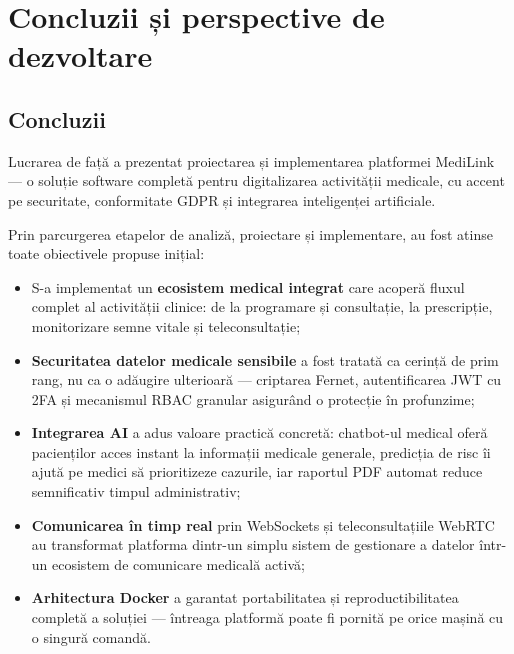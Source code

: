 \chapter{Concluzii și perspective de dezvoltare}

\section{Concluzii}

Lucrarea de față a prezentat proiectarea și implementarea platformei MediLink — o soluție software completă pentru digitalizarea activității medicale, cu accent pe securitate, conformitate GDPR și integrarea inteligenței artificiale.

Prin parcurgerea etapelor de analiză, proiectare și implementare, au fost atinse toate obiectivele propuse inițial:

\begin{itemize}
  \item S-a implementat un \textbf{ecosistem medical integrat} care acoperă fluxul complet al activității clinice: de la programare și consultație, la prescripție, monitorizare semne vitale și teleconsultație;

  \item \textbf{Securitatea datelor medicale sensibile} a fost tratată ca cerință de prim rang, nu ca o adăugire ulterioară — criptarea Fernet, autentificarea JWT cu 2FA și mecanismul RBAC granular asigurând o protecție în profunzime;

  \item \textbf{Integrarea AI} a adus valoare practică concretă: chatbot-ul medical oferă pacienților acces instant la informații medicale generale, predicția de risc îi ajută pe medici să prioritizeze cazurile, iar raportul PDF automat reduce semnificativ timpul administrativ;

  \item \textbf{Comunicarea în timp real} prin WebSockets și teleconsultațiile WebRTC au transformat platforma dintr-un simplu sistem de gestionare a datelor într-un ecosistem de comunicare medicală activă;

  \item \textbf{Arhitectura Docker} a garantat portabilitatea și reproductibilitatea completă a soluției — întreaga platformă poate fi pornită pe orice mașină cu o singură comandă.
\end{itemize}

